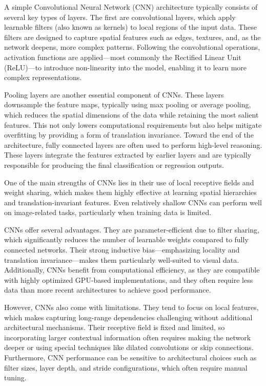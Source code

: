 \documentclass[
  a4paper,
  openany]{scrbook}
\begin{document}
A simple Convolutional Neural Network (CNN) architecture typically
consists of several key types of layers. The first are convolutional
layers, which apply learnable filters (also known as kernels) to local
regions of the input data. These filters are designed to capture spatial
features such as edges, textures, and, as the network deepens, more
complex patterns. Following the convolutional operations, activation
functions are applied---most commonly the Rectified Linear Unit
(ReLU)---to introduce non-linearity into the model, enabling it to learn
more complex representations.

Pooling layers are another essential component of CNNs. These layers
downsample the feature maps, typically using max pooling or average
pooling, which reduces the spatial dimensions of the data while
retaining the most salient features. This not only lowers computational
requirements but also helps mitigate overfitting by providing a form of
translation invariance. Toward the end of the architecture, fully
connected layers are often used to perform high-level reasoning. These
layers integrate the features extracted by earlier layers and are
typically responsible for producing the final classification or
regression outputs.

One of the main strengths of CNNs lies in their use of local receptive
fields and weight sharing, which makes them highly effective at learning
spatial hierarchies and translation-invariant features. Even relatively
shallow CNNs can perform well on image-related tasks, particularly when
training data is limited.

CNNs offer several advantages. They are parameter-efficient due to
filter sharing, which significantly reduces the number of learnable
weights compared to fully connected networks. Their strong inductive
bias---emphasizing locality and translation invariance---makes them
particularly well-suited to visual data. Additionally, CNNs benefit from
computational efficiency, as they are compatible with highly optimized
GPU-based implementations, and they often require less data than more
recent architectures to achieve good performance.

However, CNNs also come with limitations. They tend to focus on local
features, which makes capturing long-range dependencies challenging
without additional architectural mechanisms. Their receptive field is
fixed and limited, so incorporating larger contextual information often
requires making the network deeper or using special techniques like
dilated convolutions or skip connections. Furthermore, CNN performance
can be sensitive to architectural choices such as filter sizes, layer
depth, and stride configurations, which often require manual tuning.
\end{document}

